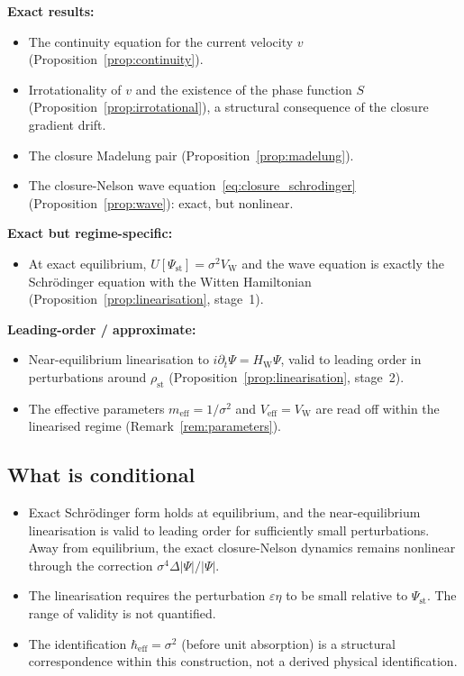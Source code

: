 \documentclass[12pt]{article}
\newcommand{\VW}{V_{\mathrm{W}}}
\begin{document}
\textbf{Exact results:}
\begin{itemize}
    \item The continuity equation for the current velocity $v$ (Proposition~\ref{prop:continuity}).
    \item Irrotationality of $v$ and the existence of the phase function $S$ (Proposition~\ref{prop:irrotational}), a structural consequence of the closure gradient drift.
    \item The closure Madelung pair (Proposition~\ref{prop:madelung}).
    \item The closure-Nelson wave equation~\eqref{eq:closure_schrodinger} (Proposition~\ref{prop:wave}): exact, but nonlinear.
\end{itemize}

\textbf{Exact but regime-specific:}
\begin{itemize}
    \item At exact equilibrium, $U[\Psi_{\mathrm{st}}] = \sigma^2\VW$ and the wave equation is exactly the Schr\"odinger equation with the Witten Hamiltonian (Proposition~\ref{prop:linearisation}, stage~1).
\end{itemize}

\textbf{Leading-order / approximate:}
\begin{itemize}
    \item Near-equilibrium linearisation to $i\partial_t\Psi = H_{\mathrm{W}}\Psi$, valid to leading order in perturbations around $\rho_{\mathrm{st}}$ (Proposition~\ref{prop:linearisation}, stage~2).
    \item The effective parameters $m_{\mathrm{eff}} = 1/\sigma^2$ and $V_{\mathrm{eff}} = \VW$ are read off within the linearised regime (Remark~\ref{rem:parameters}).
\end{itemize}

\subsection{What is conditional}

\begin{itemize}
    \item Exact Schr\"odinger form holds at equilibrium, and the near-equilibrium linearisation is valid to leading order for sufficiently small perturbations. Away from equilibrium, the exact closure-Nelson dynamics remains nonlinear through the correction $\sigma^4\Delta|\Psi|/|\Psi|$.
    \item The linearisation requires the perturbation $\varepsilon\eta$ to be small relative to $\Psi_{\mathrm{st}}$. The range of validity is not quantified.
    \item The identification $\hbar_{\mathrm{eff}} = \sigma^2$ (before unit absorption) is a structural correspondence within this construction, not a derived physical identification.
\end{itemize}
\end{document}
